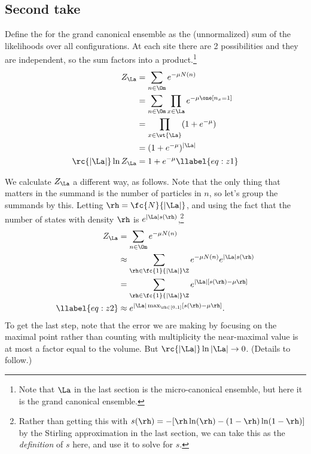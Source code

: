 

\subsection{Second take}

Define the  for the grand canonical ensemble as the (unnormalized) sum of the likelihoods over all configurations. At each site there are 2 possibilities and they are independent, so the sum factors into a product.\footnote{Note that $\La$ in the last section is the micro-canonical ensemble, but here it is the grand canonical ensemble.}
\begin{align}
\nonumber
Z_\La & = \sum_{n\in \Om} e^{-\mu N(n)} \\
\nonumber
&=\sum_{n\in \Om} \prod_{x\in \La} e^{-\mu \one[n_x=1]}\\
\nonumber
&=\prod_{x\in \wt{\La}}(1+e^{-\mu})\\
\nonumber
&= (1+e^{-\mu})^{|\La|}\\
\rc{|\La|} \ln Z_{\La} &= 1+e^{-\mu}
\llabel{eq:z1}
\end{align}

We calculate $Z_\La$ a different way, as follows.
Note that the only thing that matters in the summand is the number of particles in $n$, so let's group the summands by this. Letting $\rh=\fc{N}{|\La|}$, and using the fact that the number of states with density $\rh$ is $e^{|\La|s(\rh)}$,\footnote{Rather than getting this  with $s(\rh)=-[\rh\ln(\rh) - (1-\rh) \ln (1-\rh)]$ by the Stirling approximation in the last section, we can take this as the \emph{definition} of $s$ here, and use it to solve for $s$.}
\begin{align}
\nonumber
Z_\La&=\sum_{n\in \Om} e^{-\mu N(n)}\\
\nonumber
& \approx \sum_{\rh \in \fc{1}{|\La|}\Z} e^{-\mu N(n)} e^{|\La|s(\rh)}\\
\nonumber
& =\sum_{\rh \in \fc{1}{|\La|}\Z} e^{|\La|[s(\rh)-\mu \rh]}\\
\llabel{eq:z2}
&\approx e^{|\La|\max_{\rh\in [0,1]}[s(\rh)-\mu\rh]}.
\end{align}
To get the last step, note that the error we are making by focusing on the maximal point rather than counting with multiplicity the near-maximal value is at most a factor equal to the volume. But $\rc{|\La|}\ln |\La|\to 0$. (Details to follow.) 

